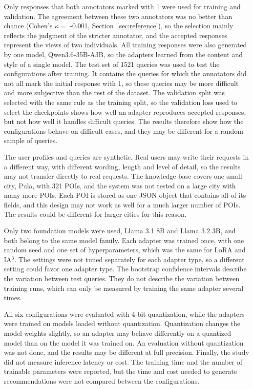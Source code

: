 \documentclass[journal,article,submit,pdftex,moreauthors]{Definitions/mdpi}
\begin{document}
Only responses that both annotators marked with 1 were used for training and validation. The agreement between these two annotators was no better than chance (Cohen's $\kappa =$ -0.001, Section~\ref{sec:reference}), so the selection mainly reflects the judgment of the stricter annotator, and the accepted responses represent the views of two individuals. All training responses were also generated by one model, Qwen3.6-35B-A3B, so the adapters learned from the content and style of a single model. The test set of 1521 queries was used to test the configurations after training. It contains the queries for which the annotators did not all mark the initial response with 1, so these queries may be more difficult and more subjective than the rest of the dataset. The validation split was selected with the same rule as the training split, so the validation loss used to select the checkpoints shows how well an adapter reproduces accepted responses, but not how well it handles difficult queries. The results therefore show how the configurations behave on difficult cases, and they may be different for a random sample of queries.

The user profiles and queries are synthetic. Real users may write their requests in a different way, with different wording, length and level of detail, so the results may not transfer directly to real requests. The knowledge base covers one small city, Pula, with 321 POIs, and the system was not tested on a large city with many more POIs. Each POI is stored as one JSON object that contains all of its fields, and this design may not work as well for a much larger number of POIs. The results could be different for larger cities for this reason.

Only two foundation models were used, Llama 3.1 8B and Llama 3.2 3B, and both belong to the same model family. Each adapter was trained once, with one random seed and one set of hyperparameters, which was the same for LoRA and IA$^3$. The settings were not tuned separately for each adapter type, so a different setting could favor one adapter type. The bootstrap confidence intervals describe the variation between test queries. They do not describe the variation between training runs, which can only be measured by training the same adapter several times.

All six configurations were evaluated with 4-bit quantization, while the adapters were trained on models loaded without quantization. Quantization changes the model weights slightly, so an adapter may behave differently on a quantized model than on the model it was trained on. An evaluation without quantization was not done, and the results may be different at full precision. Finally, the study did not measure inference latency or cost. The training time and the number of trainable parameters were reported, but the time and cost needed to generate recommendations were not compared between the configurations.
\end{document}
